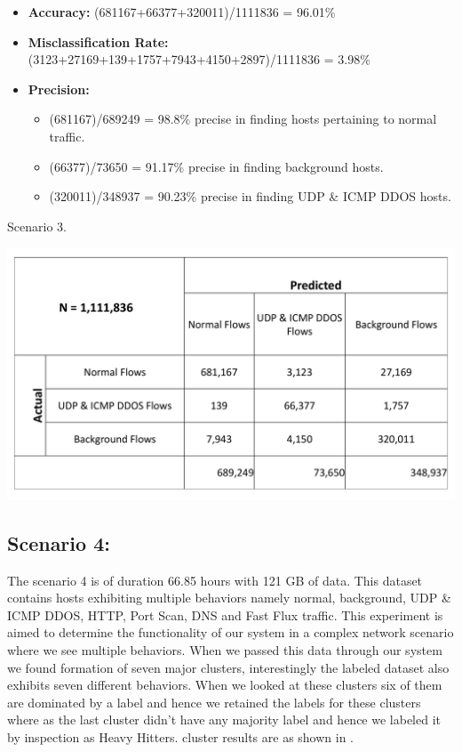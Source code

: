 \begin{itemize}
	\item \textbf{Accuracy:}  (681167+66377+320011)/1111836 = 96.01\%
	
	\item \textbf{Misclassification Rate:} (3123+27169+139+1757+7943+4150+2897)/1111836 = 3.98\%
	
	\item \textbf{Precision:} 
	\begin{itemize}	
		
		
		\item (681167)/689249 = 98.8\% precise in finding hosts pertaining to normal traffic.
		
		\item (66377)/73650 = 91.17\% precise in finding background hosts.
		
		\item (320011)/348937 = 90.23\% precise in finding UDP \& ICMP DDOS hosts.
		
	\end{itemize}
	
\end{itemize}
\begin{table}[t]
	\caption{Scenario 3.}%
	\centerline{\includegraphics[scale = 0.4]{scenario3.pdf}}	
\end{table}


\subsection{Scenario 4:}
The scenario 4 is of duration 66.85 hours with 121 GB of data. This dataset contains hosts exhibiting multiple behaviors namely normal, background, UDP \& ICMP DDOS, HTTP, Port Scan, DNS and Fast Flux traffic. This experiment is aimed to determine the functionality of our system in a complex network scenario where we see multiple behaviors. When we passed this data through our system we found formation of seven major clusters, interestingly the labeled dataset also exhibits seven different behaviors. When we looked at these clusters six of them are dominated by a label and hence we retained the labels for these clusters where as the last cluster didn't have any majority label and hence we labeled it by inspection as Heavy Hitters. cluster  results are as shown in .

